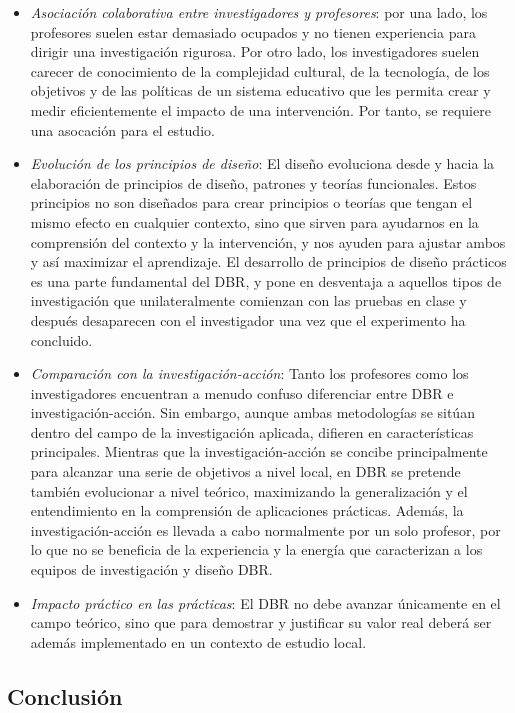 \begin{itemize}
\item \emph{Asociación colaborativa entre investigadores y profesores}: por una lado, los profesores suelen estar demasiado ocupados y no tienen experiencia para dirigir una investigación rigurosa. Por otro lado, los investigadores suelen carecer de conocimiento de la complejidad cultural, de la tecnología, de los objetivos y de las políticas de un sistema educativo que les permita crear y medir eficientemente el impacto de una intervención. Por tanto, se requiere una asocación para el estudio.
\item \emph{Evolución de los principios de diseño}: El diseño evoluciona desde y hacia la elaboración de principios de diseño, patrones y teorías funcionales. Estos principios no son diseñados para crear principios o teorías que tengan el mismo efecto en cualquier contexto, sino que sirven para ayudarnos en la comprensión del contexto y la intervención, y nos ayuden para ajustar ambos y así maximizar el aprendizaje.  El desarrollo de principios de diseño prácticos es una parte fundamental del DBR, y pone en desventaja a aquellos tipos de investigación que unilateralmente comienzan con las pruebas en clase y después desaparecen con el investigador una vez que el experimento ha concluido.
\item \emph{Comparación con la investigación-acción}: Tanto los profesores como los investigadores encuentran a menudo confuso diferenciar entre DBR e investigación-acción. Sin embargo, aunque ambas metodologías se sitúan dentro del campo de la investigación aplicada, difieren en características principales. Mientras que la investigación-acción se concibe principalmente para alcanzar una serie de objetivos a nivel local, en DBR se pretende también evolucionar a nivel teórico, maximizando la generalización y el entendimiento en la comprensión de aplicaciones prácticas. Además, la investigación-acción es llevada a cabo normalmente por un solo profesor, por lo que no se beneficia de la experiencia y la energía que caracterizan a los equipos de investigación y diseño DBR.
\item \emph{Impacto práctico en las prácticas}: El DBR no debe avanzar únicamente en el campo teórico, sino que para demostrar y justificar su valor real deberá ser además implementado en un contexto de estudio local.
\end{itemize}

\subsection*{Conclusión}

